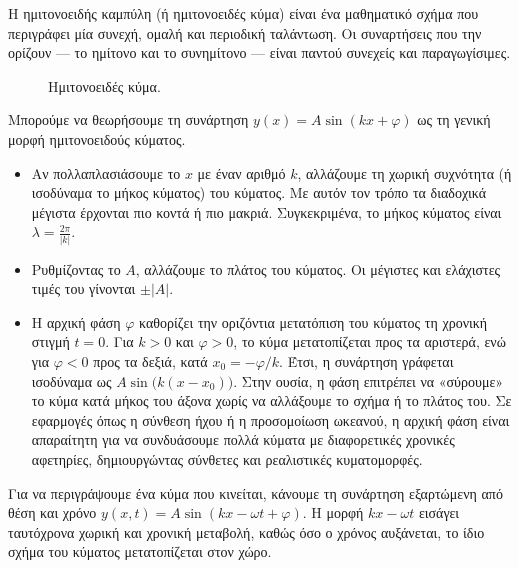 \documentclass[a4paper, 11pt]{article}
\begin{document}
Η ημιτονοειδής καμπύλη (ή ημιτονοειδές κύμα) είναι ένα μαθηματικό σχήμα
που περιγράφει μία συνεχή, ομαλή και περιοδική ταλάντωση. Οι συναρτήσεις
που την ορίζουν --- το ημίτονο και το συνημίτονο --- είναι παντού
συνεχείς και παραγωγίσιμες.

\begin{figure}[htbp]
\centering
{}
\caption{Ημιτονοειδές κύμα.}
\label{fig:sinx}
\end{figure}

Μπορούμε να θεωρήσουμε τη συνάρτηση \(y(x)=A\sin(kx+\varphi)\) ως τη
γενική μορφή ημιτονοειδούς κύματος.

\begin{itemize}
\item
  Αν πολλαπλασιάσουμε το \(x\) με έναν αριθμό \(k\), αλλάζουμε τη χωρική
  συχνότητα (ή ισοδύναμα το μήκος κύματος) του κύματος. Με αυτόν τον
  τρόπο τα διαδοχικά μέγιστα έρχονται πιο κοντά ή πιο μακριά.
  Συγκεκριμένα, το μήκος κύματος είναι \(\lambda=\frac{2\pi}{|k|}\).
\item
  Ρυθμίζοντας το \(A\), αλλάζουμε το πλάτος του κύματος. Οι μέγιστες και
  ελάχιστες τιμές του γίνονται \(\pm|A|\).
\item
  Η αρχική φάση \(\varphi\) καθορίζει την οριζόντια μετατόπιση του
  κύματος τη χρονική στιγμή \(t=0\). Για \(k>0\) και \(\varphi>0\), το
  κύμα μετατοπίζεται προς τα αριστερά, ενώ για \(\varphi<0\) προς τα
  δεξιά, κατά \(x_0=-\varphi/k\). Έτσι, η συνάρτηση γράφεται ισοδύναμα
  ως \(A\sin\bigl(k(x-x_0)\bigr)\). Στην ουσία, η φάση επιτρέπει να
  «σύρουμε» το κύμα κατά μήκος του άξονα χωρίς να αλλάξουμε το σχήμα ή
  το πλάτος του. Σε εφαρμογές όπως η σύνθεση ήχου ή η προσομοίωση
  ωκεανού, η αρχική φάση είναι απαραίτητη για να συνδυάσουμε πολλά
  κύματα με διαφορετικές χρονικές αφετηρίες, δημιουργώντας σύνθετες και
  ρεαλιστικές κυματομορφές.
\end{itemize}

Για να περιγράψουμε ένα κύμα που κινείται, κάνουμε τη συνάρτηση
εξαρτώμενη από θέση και χρόνο \(y(x,t)=A\sin(kx-\omega t + \varphi)\). Η
μορφή \(kx-\omega t\) εισάγει ταυτόχρονα χωρική και χρονική μεταβολή,
καθώς όσο ο χρόνος αυξάνεται, το ίδιο σχήμα του κύματος μετατοπίζεται
στον χώρο.
\end{document}
